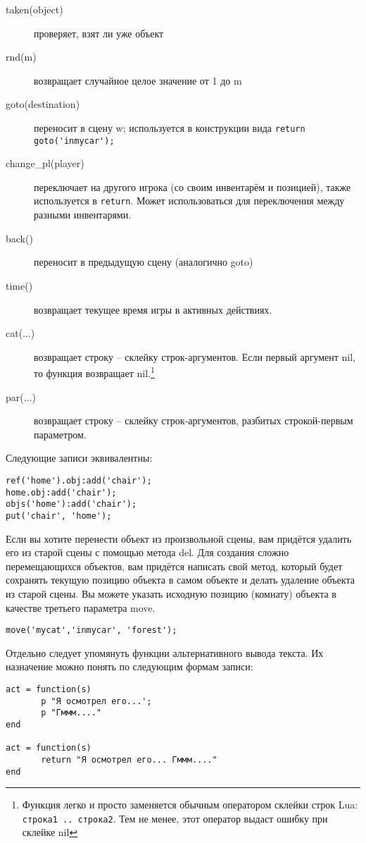 \documentclass[a4paper,12pt]{article}
\begin{document}
\begin{description}
\item[taken(object)] проверяет, взят ли уже объект
\item[rnd(m)] возвращает случайное целое значение от 1 до m
\item[goto(destination)] переносит в сцену w; используется в конструкции вида \verb/return goto('inmycar');/
\item[change\_pl(player)] переключает на другого игрока (со своим инвентарём и позицией), также используется в \verb/return/. Может использоваться для переключения между разными инвентарями.
\item[back()] переносит в предыдущую сцену (аналогично goto)
\item[time()] возвращает текущее время игры в активных действиях.
\item[cat(...)] возвращает строку -- склейку строк-аргументов. Если первый аргумент nil, то функция возвращает nil.\footnote{Функция легко и просто заменяется обычным оператором склейки строк Lua: \texttt{строка1 .. строка2}. Тем не менее, этот оператор выдаст ошибку при склейке nil}
\item[par(...)] возвращает строку -- склейку строк-аргументов, разбитых строкой-первым параметром.
\end{description}

Следующие записи эквивалентны:

\begin{verbatim}
ref('home').obj:add('chair');
home.obj:add('chair');
objs('home'):add('chair');
put('chair', 'home');
\end{verbatim}

Если вы хотите перенести объект из произвольной сцены, вам придётся удалить его из старой сцены с помощью метода del. Для создания сложно перемещающихся объектов, вам придётся написать свой метод, который будет сохранять текущую позицию объекта в самом объекте и делать удаление объекта из старой сцены. Вы можете указать исходную позицию (комнату) объекта в качестве третьего параметра move.

\begin{verbatim}
move('mycat','inmycar', 'forest');
\end{verbatim}


Отдельно следует упомянуть функции альтернативного вывода текста. Их назначение можно понять по следующим формам записи:

\begin{verbatim}
act = function(s)
       p "Я осмотрел его...';
       p "Гммм...."
end

act = function(s)
       return "Я осмотрел его... Гммм...."
end
\end{verbatim}
\end{document}
